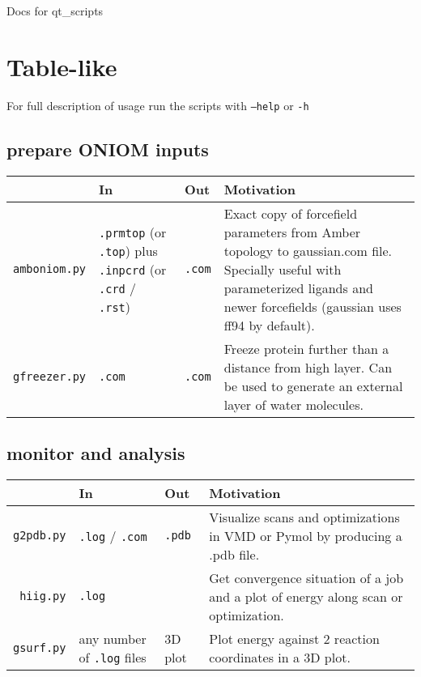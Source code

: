 \documentclass[11pt,a4paper]{article}
\begin{document}
\begin{centering}
\begin{Large}
Docs for qt\_scripts 
\end{Large}
\end{centering}

\section{Table-like}
For full description of usage run the scripts with \texttt{--help} or \texttt{-h}

\subsection{prepare ONIOM inputs} 
\begin{tabular}{|R{2.5cm}|C{4.5cm}|C{1cm}|C{7cm}|}
    \hline
     & In & Out & Motivation \\
    \hline
    \texttt{amboniom.py} & \texttt{.prmtop} (or \texttt{.top}) \newline plus \newline
\texttt{.inpcrd} (or \texttt{.crd} / \texttt{.rst}) & \texttt{.com} &
Exact copy of forcefield parameters from Amber topology to gaussian.com file.
Specially useful with parameterized ligands and newer forcefields
(gaussian uses ff94 by default).\\
\hline
    \texttt{gfreezer.py} & \texttt{.com} & \texttt{.com}  & 
    Freeze protein further than a distance from high layer.
    Can be used to generate an external layer of water molecules.\\
\hline
\end{tabular}

\subsection{monitor and analysis}
\begin{tabular}{|r|C{2.5cm}|C{1.5cm}|C{8cm}|}
    \hline
     & In & Out & Motivation \\
    \hline
    \texttt{g2pdb.py} & \texttt{.log} / \texttt{.com} & \texttt{.pdb} &
Visualize scans and optimizations in VMD or Pymol by producing a .pdb file. \\
    \hline
    \texttt{hiig.py} & \texttt{.log} & & Get convergence situation of a job and a
 plot of energy along scan or optimization. \\
    \hline
    \texttt{gsurf.py} & any number of \texttt{.log} files & 3D plot & Plot energy 
against 2 reaction coordinates in a 3D plot. \\
    \hline
\end{tabular}
\end{document}
